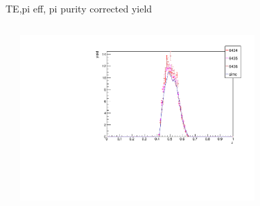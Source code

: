 \begin{frame}{TE,pi eff, pi purity corrected yield}
\begin{columns}
\begin{column}[T]{0.5\textwidth}
\end{column}
\begin{column}[T]{0.5\textwidth}
\includegraphics[width = 0.7\textwidth]{results/yield/check/yieldcheck_290_pos.pdf}
\end{column}
\end{columns}
\end{frame}
